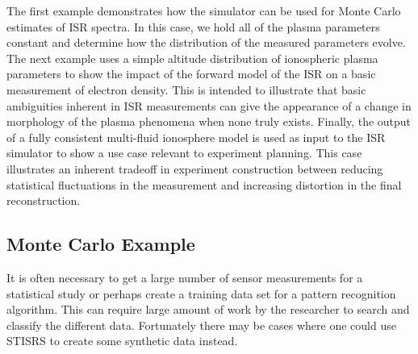 \documentclass[draft,ras]{agutex}
\newcommand{\pcom}[2]{\marginpar{{\footnotesize \bf #1}}{\it {#2}}}
\begin{document}
\begin{article}
The first example demonstrates how the simulator can be used for Monte Carlo estimates of ISR spectra. In this case, we hold all of the plasma parameters constant and determine how the distribution of the measured parameters evolve. The next example uses a simple altitude distribution of ionospheric plasma parameters to show the impact of the forward model of the ISR on a basic measurement of electron density. This is intended to illustrate that basic ambiguities inherent in ISR measurements can give the appearance of a change in morphology of the plasma phenomena when none truly exists. Finally, the output of a fully consistent multi-fluid ionosphere model is used as input to the ISR simulator to show a use case relevant to experiment planning. This case illustrates an inherent tradeoff in experiment construction between reducing statistical fluctuations in the measurement and increasing distortion in the final reconstruction.

\subsection{Monte Carlo Example}

It is often necessary to get a large number of sensor measurements for a statistical study or perhaps create a training data set for a pattern recognition algorithm. This can require large amount of work by the researcher to search and classify the different data. Fortunately there may be cases where one could use STISRS to create some synthetic data instead.



\end{article}
\end{document}
